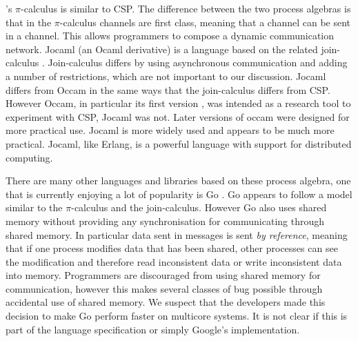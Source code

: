 \citet{milner:pi}'s $\pi$-calculus is similar to CSP.
The difference between the two process algebras is that in the $\pi$-calculus
channels are first class, meaning that a channel can be sent in a channel.
This allows programmers to compose a dynamic communication network.
Jocaml \citep{jocaml} (an Ocaml
\citep{ml-types, ocaml-modules, ocaml-bytecode, ocaml-native}
derivative) is a language based on the related join-calculus
\citep{join-calculus}.
Join-calculus differs by using asynchronous communication and adding a number
of restrictions, which are not important to our discussion.
Jocaml differs from Occam in the same ways that the join-calculus differs
from CSP.
However Occam, in particular its first version \citep{occam1},
was intended as a research tool to experiment with CSP, Jocaml was not.
Later versions of occam \citep{occam3} were designed for more practical use.
Jocaml is more widely used and appears to be much more practical.
Jocaml, like Erlang, is a powerful language with support for distributed
computing.

There are many other languages and libraries based on these process algebra,
one that is currently enjoying a lot of popularity is Go
\citep{balbaert:2012:go}.
Go appears to follow a model similar to the $\pi$-calculus and the
join-calculus.
However Go also uses shared memory without providing any synchronisation
for communicating through shared memory.
In particular data sent in messages is sent \emph{by reference},
meaning that if one process modifies data that has been shared,
other processes can see the modification and therefore read inconsistent data
or write inconsistent data into memory.
Programmers are discouraged from using shared memory for communication,
however this makes several classes of bug possible through accidental use of
shared memory.
We suspect that the developers made this decision to make Go perform faster on
multicore systems.
It is not clear if this is part of the language specification or simply
Google's implementation.

